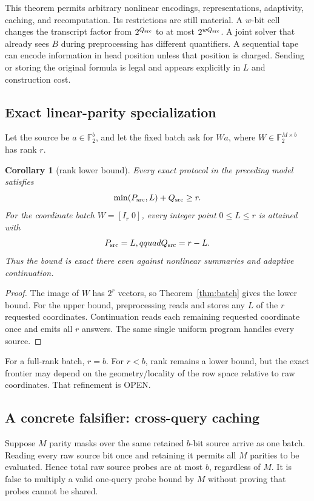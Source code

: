 \documentclass[11pt]{article}
\newtheorem{corollary}[theorem]{Corollary}
\newcommand{\F}{\mathbb F}
\newcommand{\status}[1]{\textsc{#1}}
\begin{document}
This theorem permits arbitrary nonlinear encodings, representations, adaptivity, caching, and recomputation.  Its restrictions are still material.  A $w$-bit cell changes the transcript factor from $2^{Q_{\rm src}}$ to at most $2^{wQ_{\rm src}}$.  A joint solver that already sees $B$ during preprocessing has different quantifiers.  A sequential tape can encode information in head position unless that position is charged.  Sending or storing the original formula is legal and appears explicitly in $L$ and construction cost.

\subsection{Exact linear-parity specialization}

Let the source be $a\in\F_2^b$, and let the fixed batch ask for $Wa$, where $W\in\F_2^{M\times b}$ has rank $r$.

\begin{corollary}[rank lower bound]\label{cor:rank}
Every exact protocol in the preceding model satisfies
\[
\min(P_{\rm src},L)+Q_{\rm src}\ge r.
\]
For the coordinate batch $W=[I_r\;0]$, every integer point $0\le L\le r$ is attained with
\[
P_{\rm src}=L,qquad Q_{\rm src}=r-L.
\]
Thus the bound is exact there even against nonlinear summaries and adaptive continuation.
\end{corollary}

\begin{proof}
The image of $W$ has $2^r$ vectors, so Theorem~\ref{thm:batch} gives the lower bound.  For the upper bound, preprocessing reads and stores any $L$ of the $r$ requested coordinates.  Continuation reads each remaining requested coordinate once and emits all $r$ answers.  The same single uniform program handles every source.
\end{proof}

For a full-rank batch, $r=b$.  For $r<b$, rank remains a lower bound, but the exact frontier may depend on the geometry/locality of the row space relative to raw coordinates.  That refinement is \status{OPEN}.

\subsection{A concrete falsifier: cross-query caching}

Suppose $M$ parity masks over the same retained $b$-bit source arrive as one batch.  Reading every raw source bit once and retaining it permits all $M$ parities to be evaluated.  Hence total raw source probes are at most $b$, regardless of $M$.  It is false to multiply a valid one-query probe bound by $M$ without proving that probes cannot be shared.
\end{document}
